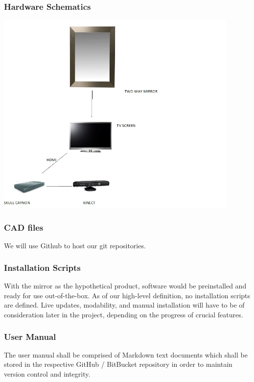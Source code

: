 \subsubsection{Hardware Schematics}
   	\includegraphics[width=0.90\textwidth]{images/Schematic}

\subsubsection{CAD files}
We will use Github to host our git repositories.

\subsubsection{Installation Scripts}
With the mirror as the hypothetical product, software would be preinstalled and ready for use out-of-the-box. As of our high-level definition, no installation scripts are defined. Live updates, modability, and manual installation will have to be of consideration later in the project, depending on the progress of crucial features.

\subsubsection{User Manual}
The user manual shall be comprised of Markdown text documents which shall be stored in the respective GitHub / BitBucket repository in order to maintain version control and integrity.